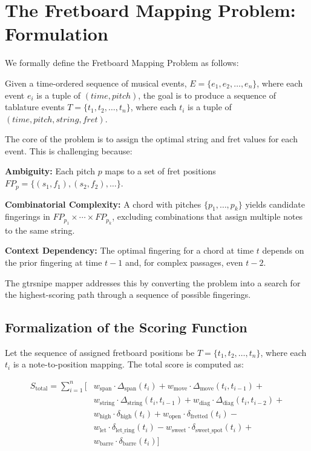 \documentclass[conference]{IEEEtran}
\begin{document}
\section{The Fretboard Mapping Problem: Formulation}

We formally define the Fretboard Mapping Problem as follows:

Given a time-ordered sequence of musical events, $E = \{e_1, e_2, \ldots, e_n\}$, where each event $e_i$ is a tuple of $(time, pitch)$, the goal is to produce a sequence of tablature events $T = \{t_1, t_2, \ldots, t_n\}$, where each $t_i$ is a tuple of $(time, pitch, string, fret)$.

The core of the problem is to assign the optimal string and fret values for each event. This is challenging because:

\textbf{Ambiguity:} Each pitch $p$ maps to a set of fret positions $FP_p = \{(s_1, f_1), (s_2, f_2), \ldots\}$.

\textbf{Combinatorial Complexity:} A chord with pitches $\{p_1, \ldots, p_k\}$ yields candidate fingerings in $FP_{p_1} \times \cdots \times FP_{p_k}$, excluding combinations that assign multiple notes to the same string.

\textbf{Context Dependency:} The optimal fingering for a chord at time $t$ depends on the prior fingering at time $t-1$ and, for complex passages, even $t-2$.

The gtrsnipe mapper addresses this by converting the problem into a search for the highest-scoring path through a sequence of possible fingerings.

\subsection{Formalization of the Scoring Function}

Let the sequence of assigned fretboard positions be \( T = \{t_1, t_2, \dots, t_n\} \), where each \( t_i \) is a note-to-position mapping. The total score is computed as:

\begin{align}
S_{\text{total}} = \sum_{i=1}^{n} \Big[
& w_{\text{span}} \cdot \Delta_{\text{span}}(t_i) +
  w_{\text{move}} \cdot \Delta_{\text{move}}(t_i, t_{i-1}) + \nonumber \\
& w_{\text{string}} \cdot \Delta_{\text{string}}(t_i, t_{i-1}) +
  w_{\text{diag}} \cdot \Delta_{\text{diag}}(t_i, t_{i-2}) + \nonumber \\
& w_{\text{high}} \cdot \delta_{\text{high}}(t_i) +
  w_{\text{open}} \cdot \delta_{\text{fretted}}(t_i) - \nonumber \\
& w_{\text{let}} \cdot \delta_{\text{let\_ring}}(t_i) -
  w_{\text{sweet}} \cdot \delta_{\text{sweet\_spot}}(t_i) + \nonumber \\
& w_{\text{barre}} \cdot \delta_{\text{barre}}(t_i) \Big]
\label{eq:score}
\end{align}
\end{document}
